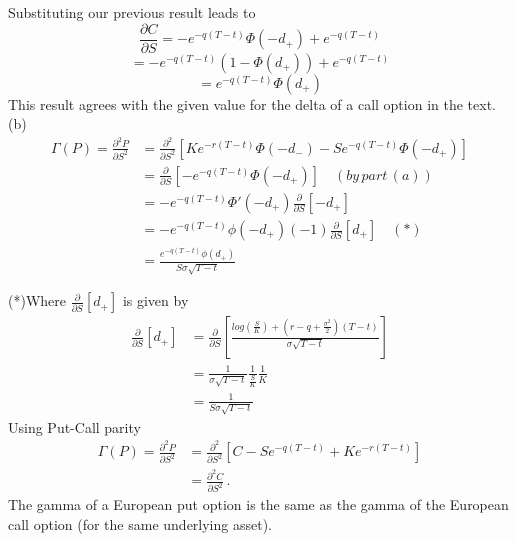 \documentclass[11pt]{article}
\begin{document}
Substituting our previous result leads to 
$$ \frac{\partial C}{\partial S} = - e^{-q(T-t)}\Phi(-d_+) + e^{-q(T-t)}$$
$$ = - e^{-q(T-t)}(1-\Phi(d_+)) + e^{-q(T-t)}$$
$$ = e^{-q(T-t)}\Phi(d_+)$$
This result agrees with the given value for the delta of a call option in the text. \\

(b) 
\begin{align*}
\Gamma(P) = \frac{\partial^2 P}{\partial S^2} &= \frac{\partial^2}{\partial S^2} [Ke^{-r(T-t)}\Phi(-d_-)-Se^{-q(T-t)}\Phi(-d_+)] \\
& = \frac{\partial}{\partial S} [-e^{-q(T-t)}\Phi(-d_+)] \quad (by \, part \, (a)) \\
& = -e^{-q(T-t)}\Phi'(-d_+) \frac{\partial}{\partial S} [-d_+] \\ & = -e^{-q(T-t)}\phi(-d_+)(-1)\frac{\partial}{\partial S} [d_+] \quad(*)\\
& = \frac{e^{-q(T-t)}\phi(d_+)}{S\sigma\sqrt{T-t}}
\end{align*}

(*)Where $\frac{\partial}{\partial S} [d_+]$ is given by
\begin{align*}
\frac{\partial}{\partial S} [d_+] &= \frac{\partial}{\partial S} \left[\frac{log(\frac{S}{K}) + (r-q+\frac{\sigma^2}{2})(T-t)}{\sigma\sqrt{T-t}}\right] \\
& = \frac{1}{\sigma\sqrt{T-t}}\frac{1}{\frac{S}{K}}\frac{1}{K} \\ 
&= \frac{1}{S\sigma\sqrt{T-t}}
\end{align*}
Using Put-Call parity
\begin{align*}
\Gamma(P) = \frac{\partial^2 P}{\partial S^2} &= \frac{\partial^2}{\partial S^2} [C-Se^{-q(T-t)} + Ke^{-r(T-t)}] \\ & = \frac{\partial^2 C}{\partial S^2} \,.
\end{align*}
The gamma of a European put option is the same as the gamma of the European call option (for the same underlying asset).\\
\end{document}
